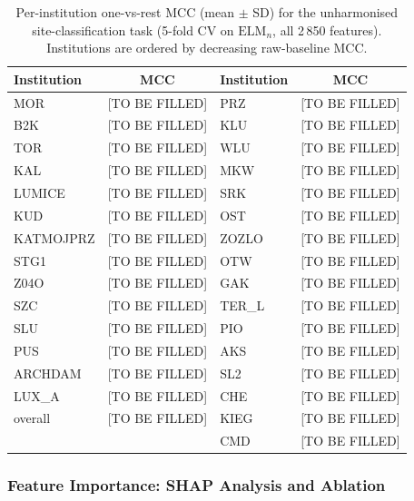 \documentclass[preprint,12pt]{elsarticle}
\begin{document}
\begin{table}[htbp]
  \centering
  \caption{Per-institution one-vs-rest MCC (mean $\pm$ SD) for the
    unharmonised site-classification task (5-fold CV on
    $\mathrm{ELM}_n$, all 2\,850 features).
    Institutions are ordered by decreasing raw-baseline MCC.}
  \label{tab:per_site_mcc}
  \begin{tabular}{lc@{\quad}lc}
    \toprule
    \textbf{Institution} & \textbf{MCC} &
    \textbf{Institution} & \textbf{MCC} \\
    \midrule
    MOR       & [TO BE FILLED] & PRZ      & [TO BE FILLED] \\
    B2K       & [TO BE FILLED] & KLU      & [TO BE FILLED] \\
    TOR       & [TO BE FILLED] & WLU      & [TO BE FILLED] \\
    KAL       & [TO BE FILLED] & MKW      & [TO BE FILLED] \\
    LUMICE    & [TO BE FILLED] & SRK      & [TO BE FILLED] \\
    KUD       & [TO BE FILLED] & OST      & [TO BE FILLED] \\
    KATMOJPRZ & [TO BE FILLED] & ZOZLO    & [TO BE FILLED] \\
    STG1      & [TO BE FILLED] & OTW      & [TO BE FILLED] \\
    Z04O      & [TO BE FILLED] & GAK      & [TO BE FILLED] \\
    SZC       & [TO BE FILLED] & TER\_L   & [TO BE FILLED] \\
    SLU       & [TO BE FILLED] & PIO      & [TO BE FILLED] \\
    PUS       & [TO BE FILLED] & AKS      & [TO BE FILLED] \\
    ARCHDAM   & [TO BE FILLED] & SL2      & [TO BE FILLED] \\
    LUX\_A    & [TO BE FILLED] & CHE      & [TO BE FILLED] \\
    overall   & [TO BE FILLED] & KIEG     & [TO BE FILLED] \\
              &                & CMD      & [TO BE FILLED] \\
    \bottomrule
  \end{tabular}
\end{table}

\subsubsection{Feature Importance: SHAP Analysis and Ablation}
\label{subsubsec:shap_results}
\end{document}
